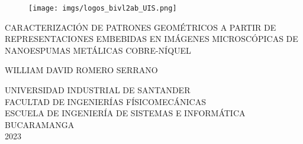 
\thispagestyle{empty}

\begin{center}
{\bfseries

\begin{figure}
    \centering
    \texttt{[image: imgs/logos\_bivl2ab\_UIS.png]}
    \vspace{1cm}
\end{figure}


CARACTERIZACIÓN DE PATRONES GEOMÉTRICOS A PARTIR DE REPRESENTACIONES EMBEBIDAS EN IMÁGENES MICROSCÓPICAS DE NANOESPUMAS METÁLICAS COBRE-NÍQUEL
\vspace{3cm}

WILLIAM DAVID ROMERO SERRANO \\
\vspace{5cm}

UNIVERSIDAD INDUSTRIAL DE SANTANDER\\
FACULTAD DE INGENIERÍAS FÍSICOMECÁNICAS\\
ESCUELA DE INGENIERÍA DE SISTEMAS E INFORMÁTICA\\
BUCARAMANGA\\
2023\\
}
\end{center}


\newpage
\thispagestyle{empty}

